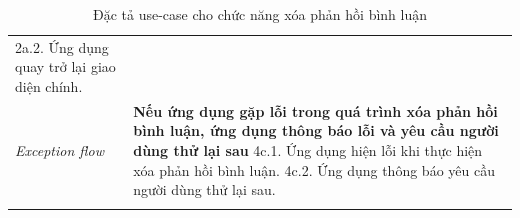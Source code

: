 \begin{center}
\begin{longtable}{
        |>{\raggedright\arraybackslash}p{3cm}
        |>{\raggedright\arraybackslash}p{13cm}
        |}
        2a.2. Ứng dụng quay trở lại giao diện chính.
        \\\hdashline
        \rowcolor{cyan!10!white} \textit{Exception flow} & 
        \textbf{Nếu ứng dụng gặp lỗi trong quá trình xóa phản hồi bình luận, ứng dụng thông báo lỗi và yêu cầu người dùng thử lại sau} \newline
        4c.1. Ứng dụng hiện lỗi khi thực hiện xóa phản hồi bình luận. \newline
        4c.2. Ứng dụng thông báo yêu cầu người dùng thử lại sau.
        \\\hline
        \caption{Đặc tả use-case cho chức năng xóa phản hồi bình luận}
    \end{longtable}
\end{center}